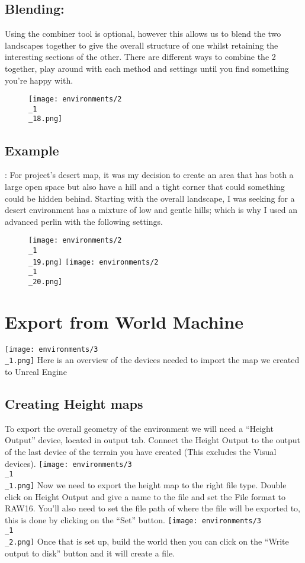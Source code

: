 \documentclass[../main.tex]{subfiles}
\begin{document}
\subsection{Blending:}
Using the combiner tool is optional, however this allows us to blend the two landscapes together to give the overall structure of one whilst retaining the interesting sections of the other.
There are different ways to combine the 2 together, play around with each method and settings until you find something you’re happy with.
\begin{figure}[H]
\texttt{[image: environments/2\\\_1\\\_18.png]}
\end{figure}

\subsection{Example}:
For project’s desert map, it was my decision to create an area that has both a large open space but also have a hill and a tight corner that could something could be hidden behind.
Starting with the overall landscape, I was seeking for a desert environment has a mixture of low and gentle hills; which is why I used an advanced perlin with the following settings.
\begin{figure}[H]
\texttt{[image: environments/2\\\_1\\\_19.png]}
\texttt{[image: environments/2\\\_1\\\_20.png]}
\end{figure}
\section{Export from World Machine}
\texttt{[image: environments/3\\\_1.png]}
Here is an overview of the devices needed to import the map we created to Unreal Engine

\subsection{Creating Height maps}
To export the overall geometry of the environment we will need a “Height Output” device, located in output tab. Connect the Height Output to the output of the last device of the terrain you have created (This excludes the Visual devices).
 \texttt{[image: environments/3\\\_1\\\_1.png]}
Now we need to export the height map to the right file type. Double click on Height Output and give a name to the file and set the File format to RAW16. You’ll also need to set the file path of where the file will be exported to, this is done by clicking on the “Set” button.
\texttt{[image: environments/3\\\_1\\\_2.png]}
Once that is set up, build the world then you can click on the “Write output to disk” button and it will create a file.
\end{document}
